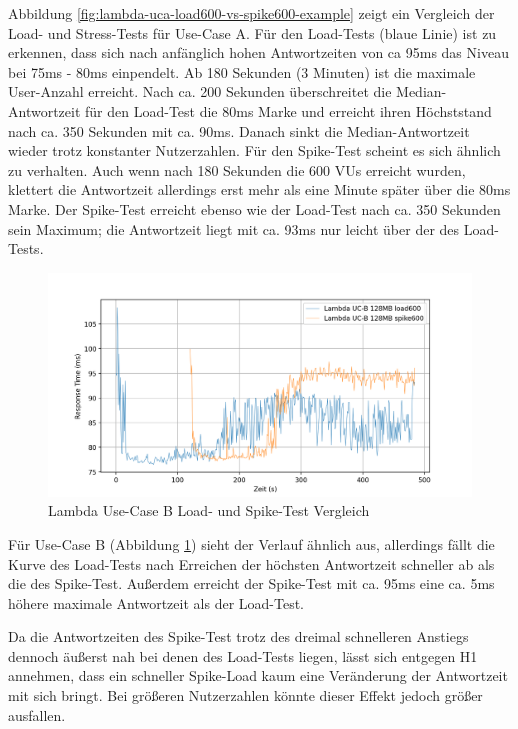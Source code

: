 Abbildung \ref{fig:lambda-uca-load600-vs-spike600-example} zeigt ein Vergleich der Load- und Stress-Tests für Use-Case A. Für den Load-Tests (blaue Linie) ist zu erkennen, dass sich nach anfänglich hohen Antwortzeiten von ca 95ms das Niveau bei 75ms - 80ms einpendelt. Ab 180 Sekunden (3 Minuten) ist die maximale User-Anzahl erreicht. Nach ca. 200 Sekunden überschreitet die Median-Antwortzeit für den Load-Test die 80ms Marke und erreicht ihren Höchststand nach ca. 350 Sekunden mit ca. 90ms. Danach sinkt die Median-Antwortzeit wieder trotz konstanter Nutzerzahlen.
Für den Spike-Test scheint es sich ähnlich zu verhalten. Auch wenn nach 180 Sekunden die 600 VUs erreicht wurden, klettert die Antwortzeit allerdings erst mehr als eine Minute später über die 80ms Marke. Der Spike-Test erreicht ebenso wie der Load-Test nach ca. 350 Sekunden sein Maximum; die Antwortzeit liegt mit ca. 93ms nur leicht über der des Load-Tests.

\begin{figure}[H]
    \includegraphics[width=\textwidth]{img/lambda-ucb-load600-vs-spike600-example.png}
    \caption[Lambda Use-Case B Load- und Spike-Test Vergleich]{Lambda Use-Case B Load- und Spike-Test Vergleich}
    \label{fig:lambda-ucb-load600-vs-spike600-example}
\end{figure}

Für Use-Case B (Abbildung \ref{fig:lambda-ucb-load600-vs-spike600-example}) sieht der Verlauf ähnlich aus, allerdings fällt die Kurve des Load-Tests nach Erreichen der höchsten Antwortzeit schneller ab als die des Spike-Test. Außerdem erreicht der Spike-Test mit ca. 95ms eine ca. 5ms höhere maximale Antwortzeit als der Load-Test. 

Da die Antwortzeiten des Spike-Test trotz des dreimal schnelleren Anstiegs dennoch äußerst nah bei denen des Load-Tests liegen, lässt sich entgegen H1 annehmen, dass ein schneller Spike-Load kaum eine Veränderung der Antwortzeit mit sich bringt. Bei größeren Nutzerzahlen könnte dieser Effekt jedoch größer ausfallen.


